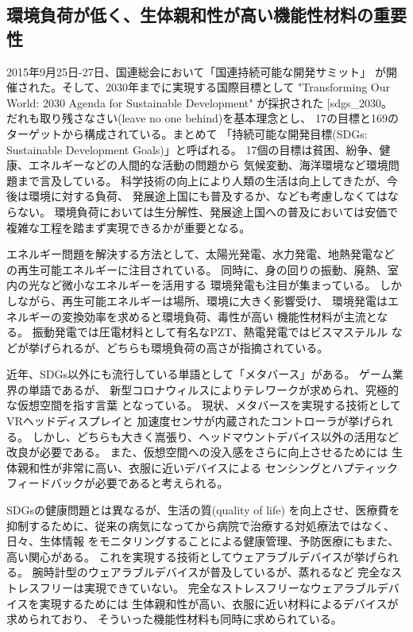 \documentclass[dvipdfmx,12pt,a4paper]{jreport}
\makeatletter
\DeclareRobustCommand\cite{\unskip
    	\@ifnextchar[{\@tempswatrue\@citex}{\@tempswafalse\@citex[]}}
\makeatother
\begin{document}
		\subsection{環境負荷が低く、生体親和性が高い機能性材料の重要性}
		2015年9月25日-27日、国連総会において「国連持続可能な開発サミット」
		が開催された。そして、2030年までに実現する国際目標として
		 "Transforming Our World: 2030 Agenda for Sustainable Development" が採択された\cite{sdgs_2030}。
		だれも取り残さなさい(leave no one behind)を基本理念とし、
		17の目標と169のターゲットから構成されている。まとめて
		「持続可能な開発目標(SDGs: Sustainable Development Goals)」と呼ばれる。
		17個の目標は貧困、紛争、健康、エネルギーなどの人間的な活動の問題から
		気候変動、海洋環境など環境問題まで言及している。
		科学技術の向上により人類の生活は向上してきたが、今後は環境に対する負荷、
		発展途上国にも普及するか、なども考慮しなくてはならない。
		環境負荷においては生分解性、発展途上国への普及においては安価で複雑な工程を踏まず実現できるかが重要となる。

		エネルギー問題を解決する方法として、太陽光発電、水力発電、地熱発電など
		の再生可能エネルギーに注目されている。
		同時に、身の回りの振動、廃熱、室内の光など微小なエネルギーを活用する
		環境発電も注目が集まっている。
		しかしながら、再生可能エネルギーは場所、環境に大きく影響受け、
		環境発電はエネルギーの変換効率を求めると環境負荷、毒性が高い
		機能性材料が主流となる。
		振動発電では圧電材料として有名なPZT、熱電発電ではビスマステルル
		などが挙げられるが、どちらも環境負荷の高さが指摘されている。

		近年、SDGs以外にも流行している単語として「メタバース」がある。
		ゲーム業界の単語であるが、
		新型コロナウィルスによりテレワークが求められ、究極的な仮想空間を指す言葉
		となっている。
		現状、メタバースを実現する技術としてVRヘッドディスプレイと
		加速度センサが内蔵されたコントローラが挙げられる。
		しかし、どちらも大きく嵩張り、ヘッドマウントデバイス以外の活用など改良が必要である。
		また、仮想空間への没入感をさらに向上させるためには
		生体親和性が非常に高い、衣服に近いデバイスによる
		センシングとハプティックフィードバックが必要であると考えられる。

		SDGsの健康問題とは異なるが、生活の質(quality of life) を向上させ、医療費を
		抑制するために、従来の病気になってから病院で治療する対処療法ではなく、日々、生体情報
		をモニタリングすることによる健康管理、予防医療にもまた、高い関心がある。
		これを実現する技術としてウェアラブルデバイスが挙げられる。
		腕時計型のウェアラブルデバイスが普及しているが、蒸れるなど
		完全なストレスフリーは実現できていない。
		完全なストレスフリーなウェアラブルデバイスを実現するためには
		生体親和性が高い、衣服に近い材料によるデバイスが求められており、
		そういった機能性材料も同時に求められている。
		\newpage
\end{document}
